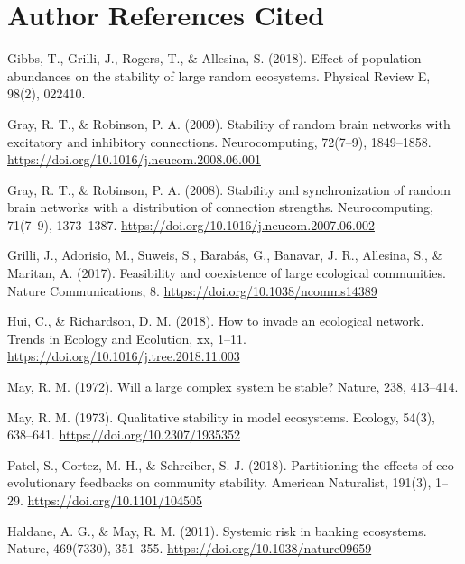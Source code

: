 \documentclass[]{article}
\begin{document}
\section{Author References Cited}\label{author-references-cited}

Gibbs, T., Grilli, J., Rogers, T., \& Allesina, S. (2018). Effect of
population abundances on the stability of large random ecosystems.
Physical Review E, 98(2), 022410.

Gray, R. T., \& Robinson, P. A. (2009). Stability of random brain
networks with excitatory and inhibitory connections. Neurocomputing,
72(7--9), 1849--1858. \url{https://doi.org/10.1016/j.neucom.2008.06.001}

Gray, R. T., \& Robinson, P. A. (2008). Stability and synchronization of
random brain networks with a distribution of connection strengths.
Neurocomputing, 71(7--9), 1373--1387.
\url{https://doi.org/10.1016/j.neucom.2007.06.002}

Grilli, J., Adorisio, M., Suweis, S., Barabás, G., Banavar, J. R.,
Allesina, S., \& Maritan, A. (2017). Feasibility and coexistence of
large ecological communities. Nature Communications, 8.
\url{https://doi.org/10.1038/ncomms14389}

Hui, C., \& Richardson, D. M. (2018). How to invade an ecological
network. Trends in Ecology and Ecolution, xx, 1--11.
\url{https://doi.org/10.1016/j.tree.2018.11.003}

May, R. M. (1972). Will a large complex system be stable? Nature, 238,
413--414.

May, R. M. (1973). Qualitative stability in model ecosystems. Ecology,
54(3), 638--641. \url{https://doi.org/10.2307/1935352}

Patel, S., Cortez, M. H., \& Schreiber, S. J. (2018). Partitioning the
effects of eco-evolutionary feedbacks on community stability. American
Naturalist, 191(3), 1--29. \url{https://doi.org/10.1101/104505}

Haldane, A. G., \& May, R. M. (2011). Systemic risk in banking
ecosystems. Nature, 469(7330), 351--355.
\url{https://doi.org/10.1038/nature09659}
\end{document}
